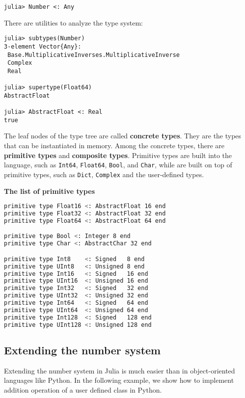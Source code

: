 \documentclass[
  notoc %
]{tufte-book}
\newcommand{\passthrough}[1]{#1}
\begin{document}
\begin{lstlisting}
julia> Number <: Any
\end{lstlisting}

There are utilities to analyze the type system:

\begin{lstlisting}
julia> subtypes(Number)
3-element Vector{Any}:
 Base.MultiplicativeInverses.MultiplicativeInverse
 Complex
 Real

julia> supertype(Float64)
AbstractFloat

julia> AbstractFloat <: Real
true
\end{lstlisting}

The leaf nodes of the type tree are called \textbf{concrete types}. They
are the types that can be instantiated in memory. Among the concrete
types, there are \textbf{primitive types} and \textbf{composite types}.
Primitive types are built into the language, such as
\passthrough{\lstinline!Int64!}, \passthrough{\lstinline!Float64!},
\passthrough{\lstinline!Bool!}, and \passthrough{\lstinline!Char!},
while are built on top of primitive types, such as
\passthrough{\lstinline!Dict!}, \passthrough{\lstinline!Complex!} and
the user-defined types.

\textbf{The list of primitive types}

\begin{lstlisting}[language=bash]
primitive type Float16 <: AbstractFloat 16 end
primitive type Float32 <: AbstractFloat 32 end
primitive type Float64 <: AbstractFloat 64 end

primitive type Bool <: Integer 8 end
primitive type Char <: AbstractChar 32 end

primitive type Int8    <: Signed   8 end
primitive type UInt8   <: Unsigned 8 end
primitive type Int16   <: Signed   16 end
primitive type UInt16  <: Unsigned 16 end
primitive type Int32   <: Signed   32 end
primitive type UInt32  <: Unsigned 32 end
primitive type Int64   <: Signed   64 end
primitive type UInt64  <: Unsigned 64 end
primitive type Int128  <: Signed   128 end
primitive type UInt128 <: Unsigned 128 end
\end{lstlisting}

\hypertarget{extending-the-number-system}{%
\subsection{Extending the number
system}\label{extending-the-number-system}}

Extending the number system in Julia is much easier than in
object-oriented languages like Python. In the following example, we show
how to implement addition operation of a user defined class in Python.
\end{document}
